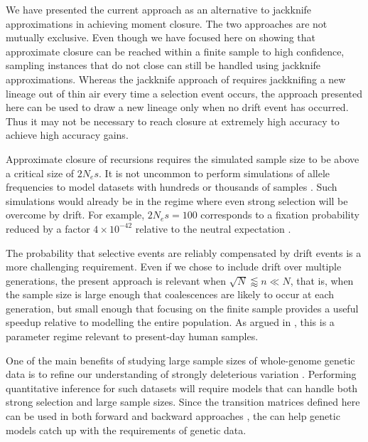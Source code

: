 \documentclass[review]{elsarticle}
\begin{document}
We have presented the current approach as an alternative to jackknife approximations in 
achieving moment closure. The two approaches are not mutually exclusive. 
Even though we have focused here on showing that approximate closure can be reached within 
a finite sample to high confidence, sampling instances that do not close can still be handled 
using jackknife approximations. Whereas the jackknife approach of \cite{JouganousEtAl2017} requires 
jackknifing a new lineage out of thin air every time a selection event occurs, the approach presented
here can be used to draw a new lineage only when no drift event has occurred. 
Thus it may not be necessary to reach closure at extremely high accuracy to achieve high accuracy
gains. 

Approximate closure of recursions requires the simulated sample size to be above a critical size of $2N_e s.$ 
It is not uncommon to perform simulations of allele frequencies to model datasets with hundreds or 
thousands of samples \citep{Gravel:2011bg, Tennessen:2012ck}. 
Such simulations would already be in the regime where even strong selection will be overcome by drift. For
example, $2N_e s = 100$ corresponds to a fixation probability reduced by a factor $4\times 10^{-42}$ relative 
to the neutral expectation \cite{Kimura:1962um}. 
 
The probability that selective events are reliably compensated by drift events is a more challenging requirement. 
Even if we chose to include drift over multiple generations, the present approach is relevant when 
$\sqrt{N}\lessapprox n \ll N$, that is, when the sample size is large enough that coalescences  are likely to
occur at each generation, but small enough that focusing on the finite sample provides a useful speedup 
relative to modelling the entire population. As argued in \citep{BhaskarEtAl2014},  this is a parameter regime
 relevant to present-day human samples.  

One of the main benefits of studying large sample sizes of whole-genome
genetic data is to refine our understanding of strongly deleterious variation \cite{karczewski2020mutational}. Performing 
quantitative inference for such datasets will require models that can handle both strong selection and large sample sizes.  
Since the transition matrices defined here can be used in both forward \citep{JouganousEtAl2017} 
and backward approaches \cite{KammEtAl2017}, the can help genetic models catch up with the requirements of genetic data.



\end{document}
